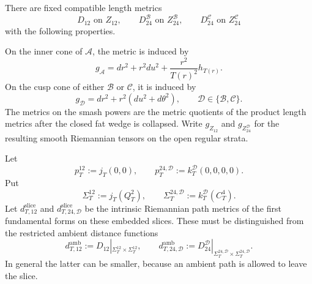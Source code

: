 \begin{theorem}
\label{wb:sphere-metric-fixed-realization}

There are fixed compatible length metrics
\[
 D_{12}\text{ on }Z_{12},\qquad
 D_{24}^{\mathcal B}\text{ on }Z_{24}^{\mathcal B},\qquad
 D_{24}^{\mathcal C}\text{ on }Z_{24}^{\mathcal C}
\]
with the following properties.

On the inner cone of \(\mathcal A\), the metric is induced by
\begin{equation}
 g_{\mathcal A}
 =dr^2+r^2du^2+\frac{r^2}{T(r)^2}h_{T(r)}.
 \label{wb:sphere-metric-A-fixed-metric}
\end{equation}
On the cusp cone of either \(\mathcal B\) or \(\mathcal C\), it is induced
by
\begin{equation}
 g_{\mathcal D}=dr^2+r^2(du^2+d\theta^2),
 \qquad\mathcal D\in\{\mathcal B,\mathcal C\}.
 \label{wb:sphere-metric-BC-fixed-metric}
\end{equation}
The metrics on the smash powers are the metric quotients of the product
length metrics after the closed fat wedge is collapsed.  Write
\(g_{Z_{12}}\) and \(g_{Z_{24}^{\mathcal D}}\) for the resulting smooth
Riemannian tensors on the open regular strata.

Let
\[
 p_T^{12}:=j_T(0,0),\qquad
 p_T^{24,\mathcal D}:=k_T^{\mathcal D}(0,0,0,0).
\]
Put
\[
 \Sigma_T^{12}:=j_T(Q_T^2),\qquad
 \Sigma_T^{24,\mathcal D}:=k_T^{\mathcal D}(C_T^4).
\]
Let \(d_{T,12}^{\mathrm{slice}}\) and
\(d_{T,24,\mathcal D}^{\mathrm{slice}}\) be the intrinsic Riemannian path
metrics of the first fundamental forms on these embedded slices.  These
must be distinguished from the restricted ambient distance functions
\[
 d_{T,12}^{\mathrm{amb}}
 :=D_{12}|_{\Sigma_T^{12}\times\Sigma_T^{12}},\qquad
 d_{T,24,\mathcal D}^{\mathrm{amb}}
 :=D_{24}^{\mathcal D}|_{\Sigma_T^{24,\mathcal D}
                         \times\Sigma_T^{24,\mathcal D}}.
\]
In general the latter can be smaller, because an ambient path is allowed
to leave the slice.


\end{theorem}
